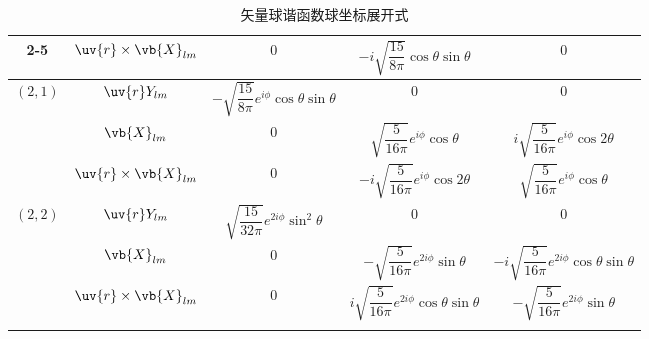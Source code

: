 \begin{longtable}{ccccc}
	\cmidrule(lr){2-5}
	          & \(\uv{r}\times\vb{X}_{lm}\) & \(0\)                                                     & \(-i\sqrt{\dfrac{15}{8\pi}}\cos\theta\sin\theta\)           & \(0\)                                                        \\
	\midrule
	\multirow{3}{*}{\((2,1)\)}
	          & \(\uv{r}Y_{lm}\)            & \(-\sqrt{\dfrac{15}{8\pi}}e^{i\phi}\cos\theta\sin\theta\) & \(0\)                                                       & \(0\)                                                        \\
	\cmidrule(lr){2-5}
	          & \(\vb{X}_{lm}\)             & \(0\)                                                     & \(\sqrt{\dfrac{5}{16\pi}}e^{i\phi}\cos\theta\)              & \(i\sqrt{\dfrac{5}{16\pi}}e^{i\phi}\cos2\theta\)             \\
	\cmidrule(lr){2-5}
	          & \(\uv{r}\times\vb{X}_{lm}\) & \(0\)                                                     & \(-i\sqrt{\dfrac{5}{16\pi}}e^{i\phi}\cos2\theta\)           & \(\sqrt{\dfrac{5}{16\pi}}e^{i\phi}\cos\theta\)               \\
	\midrule
	\multirow{3}{*}{\((2,2)\)}
	          & \(\uv{r}Y_{lm}\)            & \(\sqrt{\dfrac{15}{32\pi}}e^{2i\phi}\sin^2\theta\)        & \(0\)                                                       & \(0\)                                                        \\
	\cmidrule(lr){2-5}
	          & \(\vb{X}_{lm}\)             & \(0\)                                                     & \(-\sqrt{\dfrac{5}{16\pi}}e^{2i\phi}\sin\theta\)            & \(-i\sqrt{\dfrac{5}{16\pi}}e^{2i\phi}\cos\theta\sin\theta\)  \\
	\cmidrule(lr){2-5}
	          & \(\uv{r}\times\vb{X}_{lm}\) & \(0\)                                                     & \(i\sqrt{\dfrac{5}{16\pi}}e^{2i\phi}\cos\theta\sin\theta\)  & \(-\sqrt{\dfrac{5}{16\pi}}e^{2i\phi}\sin\theta\)             \\
	\bottomrule[1pt]
	\caption{矢量球谐函数球坐标展开式}
	\label{矢量球谐函数球坐标展开式}
\end{longtable}
\endgroup
